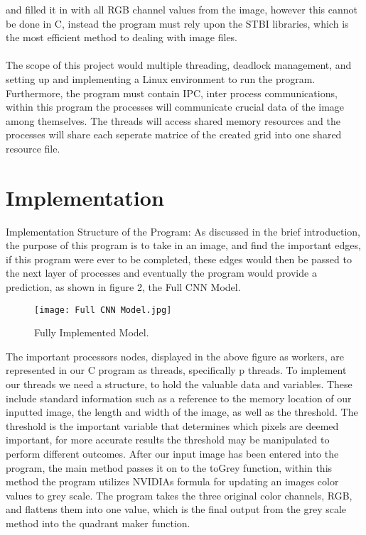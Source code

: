 \documentclass{article}
\begin{document}
and filled it in with all RGB channel values from the image, however this cannot be done in C, instead the program
must rely upon the STBI libraries, which is the most efficient method to dealing with image files.\\\vspace{.5cm}\\
The scope of this project would multiple threading, deadlock management, and setting up and implementing a Linux environment
to run the program. Furthermore, the program must contain IPC, inter process communications, within this program
the processes will communicate crucial data of the image among themselves. The threads will access shared memory resources
and the processes will share each seperate matrice of the created grid into one shared resource file.\\

\clearpage

\section*{Implementation}
Implementation
Structure of the Program: As discussed in the brief introduction, the purpose of this program is to take in an image, and find the important edges, if this program were ever to be completed, these edges would then be passed to the next layer of processes and eventually the program would provide a prediction, as shown in figure 2, the Full CNN Model.
\begin{figure}[htbp]
    \centering
    \texttt{[image: Full CNN Model.jpg]}
    \caption{Fully Implemented Model.}
    \label{fig:Full Model}
\end{figure}

The important processors nodes, displayed in the above figure as workers, are represented in 
our C program as threads, specifically p threads. To implement our threads we need a structure, 
to hold the valuable data and variables. These include standard information such as a reference to the 
memory location of our inputted image, the length and width of the image, as well as the threshold. The 
threshold is the important variable that determines which pixels are deemed important, for more accurate 
results the threshold may be manipulated to perform different outcomes. After our input image has been 
entered into the program, the main method passes it on to the toGrey function, within this method the 
program utilizes NVIDIAs formula for updating an images color values to grey scale. The program takes 
the three original color channels, RGB, and flattens them into one value, which is the final output from 
the grey scale method into the quadrant maker function.\vspace{.5cm}\\
\end{document}

